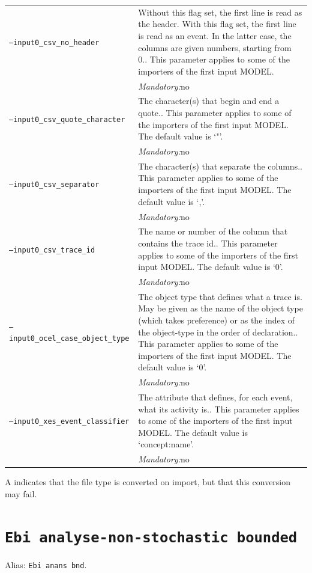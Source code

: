 {\begin{tabularx}{\linewidth}{lX}
\texttt{--input0\_csv\_no\_header} & Without this flag set, the first line is read as the header. 
    With this flag set, the first line is read as an event. In the latter case, the columns are given numbers, starting from 0.. This parameter applies to some of the importers of the first input MODEL. \\
&\textit{Mandatory:}\quad no\\
\texttt{--input0\_csv\_quote\_character} & The character(s) that begin and end a quote.. This parameter applies to some of the importers of the first input MODEL. The default value is `"'.\\
&\textit{Mandatory:}\quad no\\
\texttt{--input0\_csv\_separator} & The character(s) that separate the columns.. This parameter applies to some of the importers of the first input MODEL. The default value is `,'.\\
&\textit{Mandatory:}\quad no\\
\texttt{--input0\_csv\_trace\_id} & The name or number of the column that contains the trace id.. This parameter applies to some of the importers of the first input MODEL. The default value is `0'.\\
&\textit{Mandatory:}\quad no\\
\texttt{--input0\_ocel\_case\_object\_type} & The object type that defines what a trace is. May be given as the name of the object type (which takes preference) or as the index of the object-type in the order of declaration.. This parameter applies to some of the importers of the first input MODEL. The default value is `0'.\\
&\textit{Mandatory:}\quad no\\
\texttt{--input0\_xes\_event\_classifier} & The attribute that defines, for each event, what its activity is.. This parameter applies to some of the importers of the first input MODEL. The default value is `concept:name'.\\
&\textit{Mandatory:}\quad no\\
\bottomrule
\end{tabularx}
A \textdagger{} indicates that the file type is converted on import, but that this conversion may fail.
\clearpage\section{\texttt{Ebi analyse-non-stochastic bounded}}
\label{command:Ebi analyse-non-stochastic bounded}
Alias: \texttt{Ebi anans bnd}.\\
}

